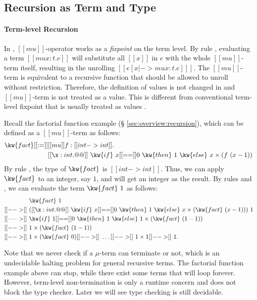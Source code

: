 \subsection{Recursion as Term and Type}
\paragraph{Term-level Recursion}

In \name, $[[mu]]$-operator works as a \emph{fixpoint} on the term
level. By rule , evaluating a term $[[mu x:t.e]]$ will
substitute all $[[x]]$ in $e$ with the whole $[[mu]]$-term itself,
resulting in the unrolling $[[e [x |-> mu x:t.e] ]]$. The
$[[mu]]$-term is equivalent to a recursive function that should be
allowed to unroll without restriction. Therefore, the definition of
values is not changed in \name and $[[mu]]$-term is not treated as a
value. This is different from conventional term-level fixpoint that is
usually treated as values \cite{zombie:popl14}.

Recall the factorial function example (\S
\ref{sec:overview:recursion}), which can be defined as a $[[mu]]$-term
as follows:
\begin{align*}
    \kw{fact} [[:=]] &[[mu]] f : [[int -> int]] . \\ &[[\x : int
        . @@]]~\kw{if}~x [[==]]0~\kw{then}~1~\kw{else}~x \times (f~(x
    - 1))
\end{align*}
By rule , the type of $\kw{fact}$ is $[[int ->
    int]]$. Thus, we can apply $\kw{fact}$ to an integer, say $1$, and
will get an integer as the result.  By rules  and
, we can evaluate the term $\kw{fact}~1$ as follows:
\begin{align*}
    &\kw{fact}~1 \\ [[-->]]~& ([[\x : int . @@]]~\kw{if}~x
  [[==]]0~\kw{then}~1~\kw{else}~x \times (\kw{fact}~(x - 1)))~1
  \\ [[-->]]~ & \kw{if}~1 [[==]]0~\kw{then}~1~\kw{else}~1 \times
  (\kw{fact}~(1 - 1)) \\ [[-->]]~& 1 \times (\kw{fact}~(1-1))
  \\ [[-->]]~& 1 \times (\kw{fact}~0) [[-->]]~ \dots [[-->]]~ 1 \times
  1 [[-->]]~ 1.
\end{align*}

Note that we never check if a $\mu$-term can terminate or not, which
is an undecidable halting problem for general recursive terms. The
factorial function example above can stop, while there exist some
terms that will loop forever. However, term-level non-termination is
only a runtime concern and does not block the type checker. Later we
will see type checking \name is still decidable.

